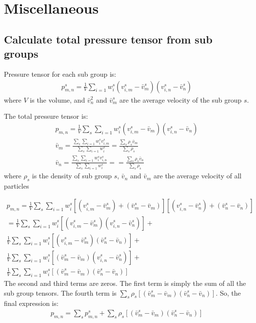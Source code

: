 \documentclass[a4paper, 11pt]{article}
\begin{document}
\section{Miscellaneous}
\subsection{Calculate total pressure tensor from sub groups}
Pressure tensor for each sub group is:
\begin{eqnarray}
    p^s_{m,n} = \frac{1}{V} \sum_{i=1} w_i^s (v_{i,m}^s-\bar{v}_m^s) (v_{i,n}^s-\bar{v}_n^s) 
\end{eqnarray}
where $V$ is the volume, and $\bar{v}_n^2$ and $\bar{v}_m^s$ are the average velocity of the sub group $s$. 

The total pressure tensor is:
\begin{eqnarray}
    p_{m,n} = \frac{1}{V} \sum_{s}\sum_{i=1} w_i^s (v_{i,m}^s-\bar{v}_m) (v_{i,n}^s-\bar{v}_n)\\
    \bar{v}_m = \frac{\sum_{s}\sum_{i=1} w_i^s v_{i,m}^s}{\sum_{s}\sum_{i=1} w_i^s} = \frac{\sum_s \rho_s \bar{v}_m}{\sum_{s}\rho_s} \\
    \bar{v}_n = \frac{\sum_{s}\sum_{i=1} w_i^s v_{i,n}^s}{\sum_{s}\sum_{i=1} w_i^s} = = \frac{\sum_s \rho_s \bar{v}_n}{\sum_{s}\rho_s}
\end{eqnarray}
where $\rho_s$ is the density of sub group $s$, $\bar{v}_n$ and $\bar{v}_m$ are the average velocity of all particles

\begin{eqnarray}
    p_{m,n} = \frac{1}{V} \sum_{s}\sum_{i=1} w_i^s [(v_{i,m}^s- \bar{v}_m^s) + (\bar{v}_m^s -\bar{v}_m)] [(v_{i,n}^s- \bar{v}_n^s) + (\bar{v}_n^s  - \bar{v}_n)]\\
    = \frac{1}{V} \sum_{s}\sum_{i=1} w_i^s[(v_{i,m}^s- \bar{v}_m^s)(v_{i,n}^s- \bar{v}_n^s)] + \\ \frac{1}{V} \sum_{s}\sum_{i=1} w_i^s[(v_{i,m}^s- \bar{v}_m^s)(\bar{v}_n^s - \bar{v}_n)] + \\
    \frac{1}{V} \sum_{s}\sum_{i=1} w_i^s[(\bar{v}_m^s -\bar{v}_m)(v_{i,n}^s- \bar{v}_n^s)] + \\ \frac{1}{V} \sum_{s}\sum_{i=1} w_i^s[(\bar{v}_m^s -\bar{v}_m)(\bar{v}_n^s - \bar{v}_n)]
\end{eqnarray}
The second and third terms are zeros. The first term is simply the sum of all the sub group tensors. The fourth term is $\sum_s \rho_s [(\bar{v}_m^s -\bar{v}_m)(\bar{v}_n^s - \bar{v}_n)]$. So, the final expression is:
\begin{eqnarray}
    p_{m,n} = \sum_s p^s_{m,n} + \sum_s \rho_s [(\bar{v}_m^s -\bar{v}_m)(\bar{v}_n^s - \bar{v}_n)]
\end{eqnarray}
\end{document}
